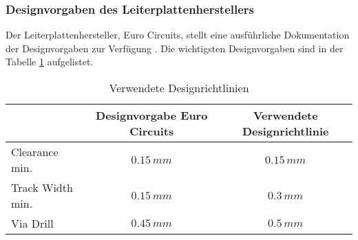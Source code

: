 \subsubsection{Designvorgaben des Leiterplattenherstellers}
\label{sec:DesignRules}

Der Leiterplattenhersteller, Euro Circuits, stellt eine ausführliche Dokumentation der Designvorgaben zur Verfügung \cite{EurocircuitsDRC}. Die wichtigsten Designvorgaben sind in der Tabelle \ref{tab:DesignRules} aufgelistet.

\begin{table}[h]
	\begin{center}
		\def\arraystretch{1.3} \tabcolsep=14pt
		\begin{tabular}{|l|c|c|}
			\cline{2-3}
			\multicolumn{1}{l|}{}  & Designvorgabe Euro Circuits & Verwendete Designrichtlinie 	\\ \hline
			Clearance min.   &  $0.15 \,\si{mm}$               & $0.15 \,\si{mm}$               \\ \hline
			Track Width min. &  $0.15 \,\si{mm}$               & $0.3 \,\si{mm}$                \\ \hline
			Via Drill        &  $0.45 \,\si{mm}$               & $0.5 \,\si{mm}$                \\ \hline
		\end{tabular}
	\end{center}
\caption{Verwendete Designrichtlinien}
\label{tab:DesignRules}
\end{table}

